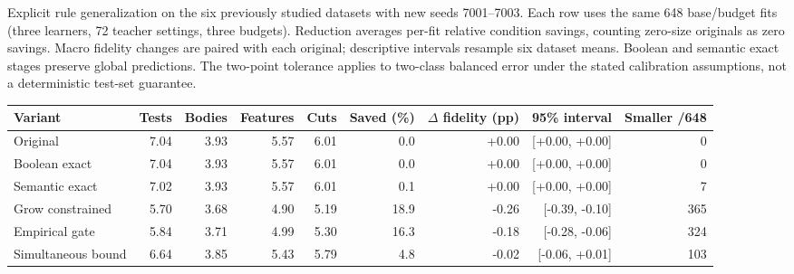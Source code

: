 \begin{kbtable}
\centering
\caption{Explicit rule generalization on the six previously studied datasets with new seeds 7001--7003. Each row uses the same 648 base/budget fits (three learners, 72 teacher settings, three budgets). Reduction averages per-fit relative condition savings, counting zero-size originals as zero savings. Macro fidelity changes are paired with each original; descriptive intervals resample six dataset means. Boolean and semantic exact stages preserve global predictions. The two-point tolerance applies to two-class balanced error under the stated calibration assumptions, not a deterministic test-set guarantee.}
\label{tab:rule-generalization}
\small
\begin{adjustbox}{max width=\linewidth}
\begin{tabular}{lrrrrrrrr}
\toprule
Variant & Tests & Bodies & Features & Cuts & Saved (\%) & $\Delta$ fidelity (pp) & 95\% interval & Smaller /648 \\
\midrule
Original & 7.04 & 3.93 & 5.57 & 6.01 & 0.0 & +0.00 & [+0.00, +0.00] & 0 \\
Boolean exact & 7.04 & 3.93 & 5.57 & 6.01 & 0.0 & +0.00 & [+0.00, +0.00] & 0 \\
Semantic exact & 7.02 & 3.93 & 5.57 & 6.01 & 0.1 & +0.00 & [+0.00, +0.00] & 7 \\
Grow constrained & 5.70 & 3.68 & 4.90 & 5.19 & 18.9 & -0.26 & [-0.39, -0.10] & 365 \\
Empirical gate & 5.84 & 3.71 & 4.99 & 5.30 & 16.3 & -0.18 & [-0.28, -0.06] & 324 \\
Simultaneous bound & 6.64 & 3.85 & 5.43 & 5.79 & 4.8 & -0.02 & [-0.06, +0.01] & 103 \\
\bottomrule
\end{tabular}
\end{adjustbox}
\end{kbtable}
